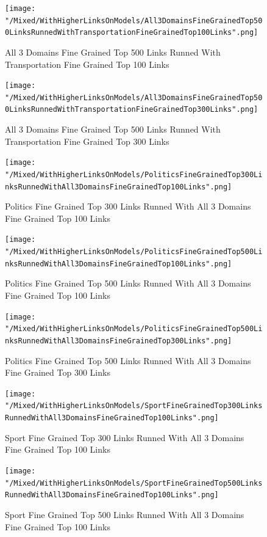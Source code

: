 \documentclass[thesis=M,english]{FITthesis}[2018/05/30]
\begin{document}
	\begin{figure}[H]\centering
		\texttt{[image: "/Mixed/WithHigherLinksOnModels/All3DomainsFineGrainedTop500LinksRunnedWithTransportationFineGrainedTop100Links".png]}
		\caption{All 3 Domains Fine Grained Top 500 Links Runned With Transportation Fine Grained Top 100 Links}\label{}
	\end{figure}	
	
	\begin{figure}[H]\centering
		\texttt{[image: "/Mixed/WithHigherLinksOnModels/All3DomainsFineGrainedTop500LinksRunnedWithTransportationFineGrainedTop300Links".png]}
		\caption{All 3 Domains Fine Grained Top 500 Links Runned With Transportation Fine Grained Top 300 Links}\label{}
	\end{figure}	
	
	\begin{figure}[H]\centering
		\texttt{[image: "/Mixed/WithHigherLinksOnModels/PoliticsFineGrainedTop300LinksRunnedWithAll3DomainsFineGrainedTop100Links".png]}
		\caption{Politics Fine Grained Top 300 Links Runned With All 3 Domains Fine Grained Top 100 Links}\label{}
	\end{figure}	
	
	\begin{figure}[H]\centering
		\texttt{[image: "/Mixed/WithHigherLinksOnModels/PoliticsFineGrainedTop500LinksRunnedWithAll3DomainsFineGrainedTop100Links".png]}
		\caption{Politics Fine Grained Top 500 Links Runned With All 3 Domains Fine Grained Top 100 Links}\label{}
	\end{figure}
	
	\begin{figure}[H]\centering
		\texttt{[image: "/Mixed/WithHigherLinksOnModels/PoliticsFineGrainedTop500LinksRunnedWithAll3DomainsFineGrainedTop300Links".png]}
		\caption{Politics Fine Grained Top 500 Links Runned With All 3 Domains Fine Grained Top 300 Links}\label{}
	\end{figure}
	
	\begin{figure}[H]\centering
		\texttt{[image: "/Mixed/WithHigherLinksOnModels/SportFineGrainedTop300LinksRunnedWithAll3DomainsFineGrainedTop100Links".png]}
		\caption{Sport Fine Grained Top 300 Links Runned With All 3 Domains Fine Grained Top 100 Links}\label{}
	\end{figure}
	
	\begin{figure}[H]\centering
		\texttt{[image: "/Mixed/WithHigherLinksOnModels/SportFineGrainedTop500LinksRunnedWithAll3DomainsFineGrainedTop100Links".png]}
		\caption{Sport Fine Grained Top 500 Links Runned With All 3 Domains Fine Grained Top 100 Links}\label{}
	\end{figure}
	
\end{document}
